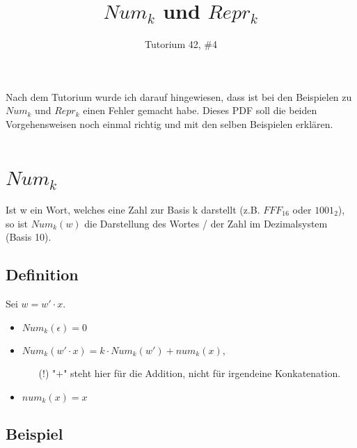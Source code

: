 \documentclass[11pt]{article} %
\title{$Num_k$ und $Repr_k$}
\author{Tutorium 42, \#4}
\date{} %
\begin{document}
\maketitle
Nach dem Tutorium wurde ich darauf hingewiesen, dass ist bei den Beispielen zu $Num_k$ und $Repr_k$ einen Fehler gemacht habe. Dieses PDF soll die beiden Vorgehensweisen noch einmal richtig und mit den selben Beispielen erklären.\\
\ \\
\section{$Num_k$}%

Ist w ein Wort, welches eine Zahl zur Basis k darstellt (z.B. $FFF_{16}$ oder $1001_2$), so ist $Num_k(w)$ die Darstellung des Wortes / der Zahl im Dezimalsystem (Basis 10).

\subsection{Definition} %

Sei $w = w' \cdot x$.
\begin{itemize}
	\item $Num_k(\epsilon) = 0$
	\item $Num_k(w' \cdot x) = k \cdot Num_k(w') + num_k(x)$, 
	\begin{itemize}
		\item[(!)] "$+$" steht hier für die Addition, nicht für irgendeine Konkatenation.
	\end{itemize}
	\item $num_k(x) = x$
\end{itemize}



\subsection{Beispiel} %
\end{document}
